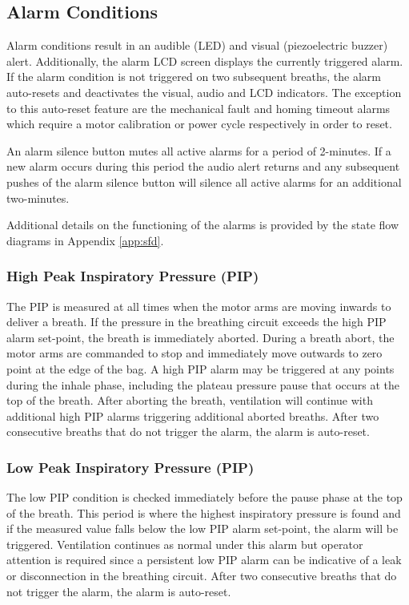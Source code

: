 \documentclass[]{article}
\begin{document}
\subsection{Alarm Conditions}
\label{sect:alarms}

Alarm conditions result in an audible (LED) and visual (piezoelectric buzzer) alert. Additionally, the alarm LCD screen displays the currently triggered alarm.  If the alarm condition is not triggered on two subsequent breaths, the alarm auto-resets and deactivates the visual, audio and LCD indicators.  The exception to this auto-reset feature are the mechanical fault and homing timeout alarms which require a motor calibration or power cycle respectively in order to reset. 

An alarm silence button mutes all active alarms for a period of 2-minutes.  If a new alarm occurs during this period the audio alert returns and any subsequent pushes of the alarm silence button will silence all active alarms for an additional two-minutes.

Additional details on the functioning of the alarms is provided by the state flow diagrams in Appendix \ref{app:sfd}.

\subsubsection{High Peak Inspiratory Pressure (PIP)}
The PIP is measured at all times when the motor arms are moving inwards to deliver a breath.  If the pressure in the breathing circuit exceeds the high PIP alarm set-point, the breath is immediately aborted. During a breath abort, the motor arms are commanded to stop and immediately move outwards to zero point at the edge of the bag.  A high PIP alarm may be triggered at any points during the inhale phase, including the plateau pressure pause that occurs at the top of the breath.  After aborting the breath, ventilation will continue with additional high PIP alarms triggering additional aborted breaths.  After two consecutive breaths that do not trigger the alarm, the alarm is auto-reset.

\subsubsection{Low Peak Inspiratory Pressure (PIP)}
The low PIP condition is checked immediately before the pause phase at the top of the breath.  This period is where the highest inspiratory pressure is found and if the measured value falls below the low PIP alarm set-point, the alarm will be triggered.  Ventilation continues as normal under this alarm but operator attention is required since a persistent low PIP alarm can be indicative of a leak or disconnection in the breathing circuit. After two consecutive breaths that do not trigger the alarm, the alarm is auto-reset.
\end{document}
